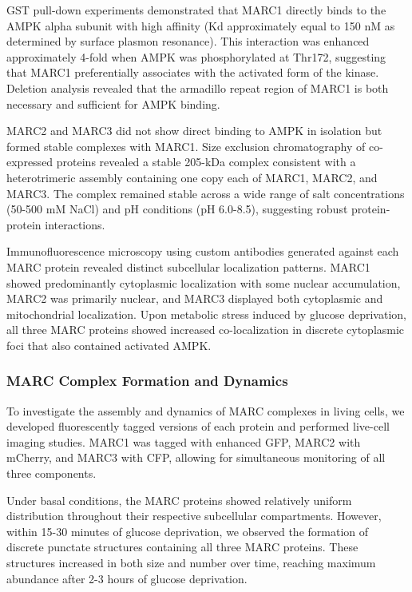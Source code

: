 \documentclass[11pt,a4paper]{article}
\begin{document}
GST pull-down experiments demonstrated that MARC1 directly binds to the AMPK alpha subunit with high affinity (Kd approximately equal to 150 nM as determined by surface plasmon resonance). This interaction was enhanced approximately 4-fold when AMPK was phosphorylated at Thr172, suggesting that MARC1 preferentially associates with the activated form of the kinase. Deletion analysis revealed that the armadillo repeat region of MARC1 is both necessary and sufficient for AMPK binding.

MARC2 and MARC3 did not show direct binding to AMPK in isolation but formed stable complexes with MARC1. Size exclusion chromatography of co-expressed proteins revealed a stable 205-kDa complex consistent with a heterotrimeric assembly containing one copy each of MARC1, MARC2, and MARC3. The complex remained stable across a wide range of salt concentrations (50-500 mM NaCl) and pH conditions (pH 6.0-8.5), suggesting robust protein-protein interactions.

Immunofluorescence microscopy using custom antibodies generated against each MARC protein revealed distinct subcellular localization patterns. MARC1 showed predominantly cytoplasmic localization with some nuclear accumulation, MARC2 was primarily nuclear, and MARC3 displayed both cytoplasmic and mitochondrial localization. Upon metabolic stress induced by glucose deprivation, all three MARC proteins showed increased co-localization in discrete cytoplasmic foci that also contained activated AMPK.

\subsubsection{MARC Complex Formation and Dynamics}

To investigate the assembly and dynamics of MARC complexes in living cells, we developed fluorescently tagged versions of each protein and performed live-cell imaging studies. MARC1 was tagged with enhanced GFP, MARC2 with mCherry, and MARC3 with CFP, allowing for simultaneous monitoring of all three components.

Under basal conditions, the MARC proteins showed relatively uniform distribution throughout their respective subcellular compartments. However, within 15-30 minutes of glucose deprivation, we observed the formation of discrete punctate structures containing all three MARC proteins. These structures increased in both size and number over time, reaching maximum abundance after 2-3 hours of glucose deprivation.
\end{document}
